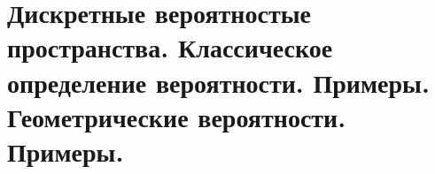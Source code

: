\section{Дискретные вероятностые пространства. Классическое определение вероятности. Примеры. Геометрические вероятности. Примеры.}